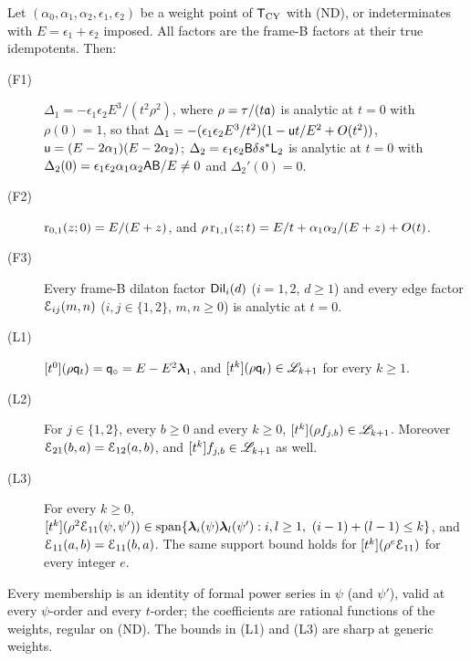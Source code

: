 \begin{thm}
\label{thm:int-leaf}
Let $(\alpha_0,\alpha_1,\alpha_2,\epsilon_1,\epsilon_2)$ be a weight point of $\mathsf{T}_{\mathrm{CY}}$ with (ND), or indeterminates with $E=\epsilon_1+\epsilon_2$ imposed. All factors are the frame-B factors at their true idempotents. Then:
\begin{description}
\item[(F1)] $\Delta_1=-\epsilon_1\epsilon_2E^3/(t^2\rho^2)$, where $\rho=\tau/(t\mathfrak{a})$ is analytic at $t=0$ with $\rho(0)=1$, so that $\Delta_1=-(\epsilon_1\epsilon_2E^3/t^2)(1-\mathsf{u} t/E^2+O(t^2))$, $\mathsf{u}=(E-2\alpha_1)(E-2\alpha_2)$; $\Delta_2=\epsilon_1\epsilon_2\mathsf{B}\delta s^{\ast}\mathsf{L}_2$ is analytic at $t=0$ with $\Delta_2(0)=\epsilon_1\epsilon_2\alpha_1\alpha_2\mathsf{A}\mathsf{B}/E\neq0$ and $\Delta_2'(0)=0$.
\item[(F2)] $\mathrm{r}_{0,1}(z;0)=E/(E+z)$, and $\rho\,\mathrm{r}_{1,1}(z;t)=E/t+\alpha_1\alpha_2/(E+z)+O(t)$.
\item[(F3)] Every frame-B dilaton factor $\mathsf{Dil}_i(d)$ ($i=1,2$, $d\geq1$) and every edge factor $\mathcal{E}_{ij}(m,n)$ ($i,j\in\{1,2\}$, $m,n\geq0$) is analytic at $t=0$.
\item[(L1)] $[t^0](\rho\mathsf{q}_{t})=\mathsf{q}_{\circ}=E-E^2\boldsymbol{\lambda}_1$, and $[t^k](\rho\mathsf{q}_{t})\in\mathscr{L}_{k+1}$ for every $k\geq1$.
\item[(L2)] For $j\in\{1,2\}$, every $b\geq0$ and every $k\geq0$, $[t^k](\rho f_{j,b})\in\mathscr{L}_{k+1}$. Moreover $\mathcal{E}_{21}(b,a)=\mathcal{E}_{12}(a,b)$, and $[t^k]f_{j,b}\in\mathscr{L}_{k+1}$ as well.
\item[(L3)] For every $k\geq0$, $\coef{t^k}(\rho^2\Edge_{11}(\psi,\psi'))\in\mathrm{span}\{\lf_i(\psi)\lf_l(\psi'):i,l\geq1,\ (i-1)+(l-1)\leq k\}$, and $\mathcal{E}_{11}(a,b)=\mathcal{E}_{11}(b,a)$. The same support bound holds for $[t^k](\rho^e\mathcal{E}_{11})$ for every integer $e$.
\end{description}
Every membership is an identity of formal power series in $\psi$ (and $\psi'$), valid at every $\psi$-order and every $t$-order; the coefficients are rational functions of the weights, regular on (ND). The bounds in (L1) and (L3) are sharp at generic weights.
\end{thm}

